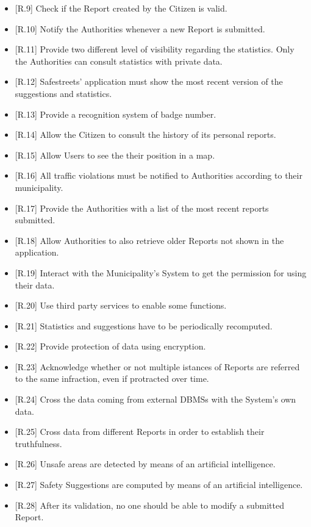 \documentclass{report}
\begin{document}
\begin{itemize}
	\item {[R.9]} Check if the Report created by the Citizen is valid.
	\item {[R.10]} Notify the Authorities whenever a new Report is submitted. 
	\item {[R.11]} Provide two different level of visibility regarding the statistics. Only the Authorities can consult statistics with private data.
	\item {[R.12]} Safestreets' application must show the most recent version of the suggestions and statistics.
	\item {[R.13]} Provide a recognition system of badge number.
	\item {[R.14]} Allow the Citizen to consult the history of its personal reports.
	\item {[R.15]} Allow Users to see the their position in a map.
	\item {[R.16]} All traffic violations must be notified to Authorities according to their municipality.
	\item {[R.17]} Provide the Authorities with a list of the most recent reports submitted.
	\item {[R.18]} Allow Authorities to also retrieve older Reports not shown in the application.
	\item {[R.19]} Interact with the Municipality's System to get the permission for using their data.
	\item {[R.20]} Use third party services to enable some functions.
	\item {[R.21]} Statistics and suggestions have to be periodically recomputed.
	\item {[R.22]} Provide protection of data using encryption.
	\item {[R.23]} Acknowledge whether or not multiple istances of Reports are referred to the same infraction, even if protracted over time.
	\item {[R.24]} Cross the data coming from external DBMSs with the System's own data.
	\item {[R.25]} Cross data from different Reports in order to establish their truthfulness.
	\item {[R.26]} Unsafe areas are detected by means of an artificial intelligence.
	\item {[R.27]} Safety Suggestions are computed by means of an artificial intelligence.
	\item {[R.28]} After its validation, no one should be able to modify a submitted Report.
\end{itemize}
\end{document}
